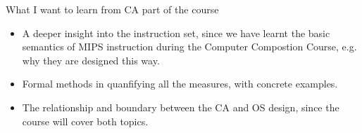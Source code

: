 \documentclass{article}
\begin{document}
\begin{enumerate}
What I want to learn from CA part of the course
\begin{itemize}
    \item A deeper insight into the instruction set, since we have learnt the basic semantics of MIPS instruction during the Computer Compostion Course, e.g. why they are designed this way.
    \item Formal methods in quanfifying all the measures, with concrete examples.
    \item The relationship and boundary between the CA and OS design,  since the course will cover both topics.
\end{itemize}


\end{enumerate}
\end{document}
